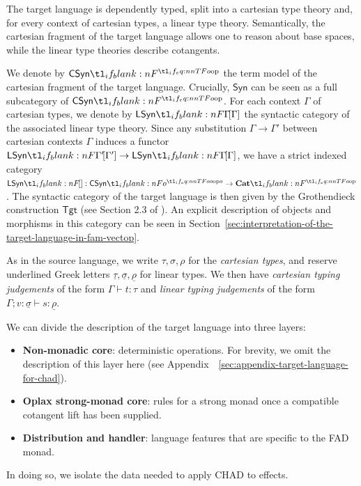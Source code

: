 \documentclass[11pt,a4paper]{article}
\theoremstyle{definition}
\theoremstyle{remark}
\providecommand{\Syn}{\mathsf{Syn}}
\providecommand{\lintype}[1]{\underline{#1}}
\providecommand{\Tgt}{\mathsf{Tgt}}
\begin{document}
The target language is dependently typed, split into a cartesian type theory and, for every context of cartesian types, a linear type theory. Semantically, the cartesian fragment of the target language allows one to reason about base spaces, while the linear type theories describe cotangents.

We denote by \( \CSyn \) the term model of the cartesian fragment of the target language. Crucially, \( \Syn \) can be seen as a full subcategory of \( \CSyn \). For each context \( \Gamma \) of cartesian types, we denote by \( \LSyn[\Gamma] \) the syntactic category of the associated linear type theory. Since any substitution \( \Gamma \to \Gamma' \) between cartesian contexts \( \Gamma \) induces a functor \( \LSyn[\Gamma'] \to \LSyn[\Gamma] \), we have a strict indexed category \( \LSyn: \CSyn[o] \to \Cat \). The syntactic category of the target language is then given by the Grothendieck construction \( \Tgt \) (see Section 2.3 of \cite{lucatellinunesCHADExpressiveTotal2023}). An explicit description of objects and morphisms in this category can be seen in Section~\ref{sec:interpretation-of-the-target-language-in-fam-vectop}.

As in the source language, we write \( \tau, \sigma, \rho \) for the \emph{cartesian types}, and reserve underlined Greek letters \( \lintype{\tau}, \lintype{\sigma}, \lintype{\rho} \) for linear types. We then have \emph{cartesian typing judgements} of the form \( \Gamma \vdash t : \tau \) and \emph{linear typing judgements} of the form \( \Gamma ; v : \lintype{\sigma} \vdash s : \lintype{\rho} \).

We can divide the description of the target language into three layers:
\begin{itemize}
\item \textbf{Non-monadic core}: deterministic operations. For brevity, we omit the description of this layer here (see Appendix~~\ref{sec:appendix-target-language-for-chad}).
\item \textbf{Oplax strong-monad core}: rules for a strong monad once a compatible cotangent lift has been supplied.
\item \textbf{Distribution and handler}: language features that are specific to the FAD monad.
\end{itemize}
In doing so, we isolate the data needed to apply CHAD to effects.
\end{document}
